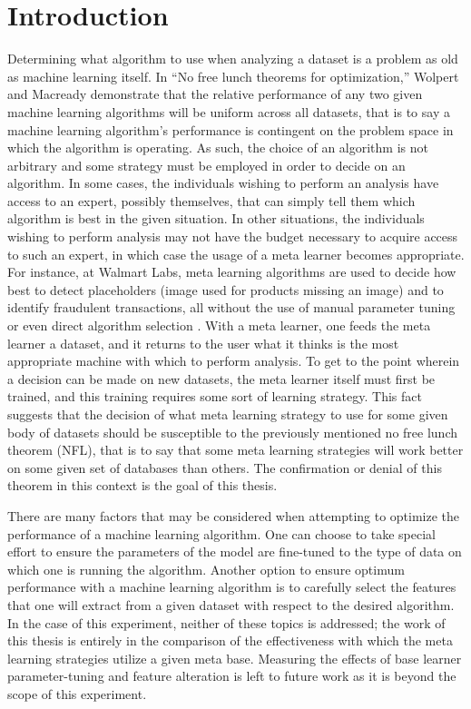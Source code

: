 \chapter{Introduction}
\label{Introduction}
Determining what algorithm to use when analyzing a dataset is a problem as
old as machine learning itself. In ``No free lunch theorems for optimization,''
Wolpert and Macready demonstrate that the relative performance of any two given
machine learning algorithms will be uniform across all datasets, that is to say
a machine learning algorithm's performance is contingent on the problem space in
which the algorithm is operating. As such, the choice of an algorithm is not
arbitrary and some strategy must be employed in order to decide
on an algorithm. In some cases, the individuals wishing to perform an analysis
have access to an expert, possibly themselves, that can simply tell them which
algorithm is best in the given situation. In other situations, the individuals
wishing to perform analysis may not have the budget necessary to acquire access
to such an expert, in which case the usage of a meta learner becomes appropriate.
For instance, at Walmart Labs, meta learning algorithms are used to decide how
best to detect placeholders (image used for products missing an image) and to identify fraudulent transactions, all without
the use of manual parameter tuning or even direct algorithm selection \cite{Gupta}.
With a meta learner, one feeds the meta learner a dataset, and it returns to the
user what it thinks is the most appropriate machine with which to perform
analysis. To get to the point wherein a decision can be made on new datasets, the
meta learner itself must first be trained, and this training requires some
sort of learning strategy. This fact suggests that the decision of what
meta learning strategy to use for some given body of datasets should be
susceptible to the previously mentioned no free lunch theorem (NFL), that is to say
that some meta learning strategies will work better on some given set of
databases than others. The confirmation or denial of this theorem in this
context is the goal of this thesis.

There are many factors that may be considered when attempting to optimize
the performance of a machine learning algorithm. One can choose to take special
effort to ensure the parameters of the model are fine-tuned to the type of data
on which one is running the algorithm. Another option to ensure optimum performance
with a machine learning algorithm is to carefully select the features that
one will extract from a given dataset with respect to the desired algorithm.
In the case of this experiment, neither of these topics is addressed; the work
of this thesis is entirely in the comparison of the effectiveness with which
the meta learning strategies utilize a given meta base. Measuring the effects of
base learner parameter-tuning and feature alteration is left to future work as
it is beyond the scope of this experiment.

